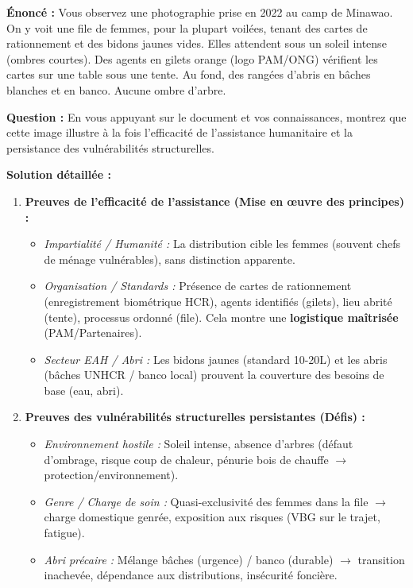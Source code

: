\documentclass[11pt]{article}
\begin{document}
\begin{exoresolu}
\textbf{Énoncé :} Vous observez une photographie prise en 2022 au camp de Minawao. On y voit une file de femmes, pour la plupart voilées, tenant des cartes de rationnement et des bidons jaunes vides. Elles attendent sous un soleil intense (ombres courtes). Des agents en gilets orange (logo PAM/ONG) vérifient les cartes sur une table sous une tente. Au fond, des rangées d'abris en bâches blanches et en banco. Aucune ombre d'arbre.

\textbf{Question :} En vous appuyant sur le document et vos connaissances, montrez que cette image illustre à la fois l'efficacité de l'assistance humanitaire et la persistance des vulnérabilités structurelles.

\textbf{Solution détaillée :}
\begin{enumerate}
    \item \textbf{Preuves de l'efficacité de l'assistance (Mise en œuvre des principes) :}
    \begin{itemize}
        \item \textit{Impartialité / Humanité :} La distribution cible les femmes (souvent chefs de ménage vulnérables), sans distinction apparente.
        \item \textit{Organisation / Standards :} Présence de cartes de rationnement (enregistrement biométrique HCR), agents identifiés (gilets), lieu abrité (tente), processus ordonné (file). Cela montre une \textbf{logistique maîtrisée} (PAM/Partenaires).
        \item \textit{Secteur EAH / Abri :} Les bidons jaunes (standard 10-20L) et les abris (bâches UNHCR / banco local) prouvent la couverture des besoins de base (eau, abri).
    \end{itemize}
    \item \textbf{Preuves des vulnérabilités structurelles persistantes (Défis) :}
    \begin{itemize}
        \item \textit{Environnement hostile :} Soleil intense, absence d'arbres (défaut d'ombrage, risque coup de chaleur, pénurie bois de chauffe $\rightarrow$ protection/environnement).
        \item \textit{Genre / Charge de soin :} Quasi-exclusivité des femmes dans la file $\rightarrow$ charge domestique genrée, exposition aux risques (VBG sur le trajet, fatigue).
        \item \textit{Abri précaire :} Mélange bâches (urgence) / banco (durable) $\rightarrow$ transition inachevée, dépendance aux distributions, insécurité foncière.

\end{itemize}
\end{enumerate}
\end{exoresolu}
\end{document}
